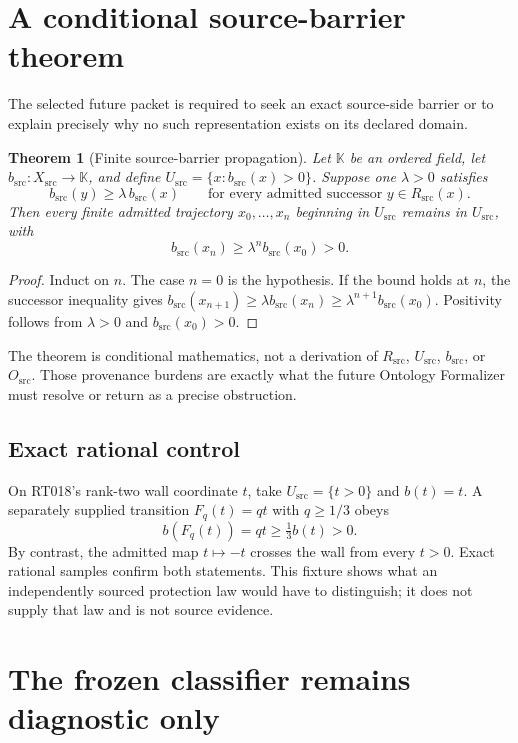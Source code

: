 \documentclass[11pt]{article}
\newtheorem{theorem}{Theorem}
\newcommand{\K}{\mathbb{K}}
\newcommand{\Xsrc}{X_{\mathrm{src}}}
\newcommand{\Rsrc}{R_{\mathrm{src}}}
\newcommand{\Usrc}{U_{\mathrm{src}}}
\newcommand{\bsrc}{b_{\mathrm{src}}}
\newcommand{\Osrc}{O_{\mathrm{src}}}
\begin{document}
\section{A conditional source-barrier theorem}

The selected future packet is required to seek an exact source-side barrier
or to explain precisely why no such representation exists on its declared
domain.

\begin{theorem}[Finite source-barrier propagation]
Let $\K$ be an ordered field, let $\bsrc:\Xsrc\to\K$, and define
$\Usrc=\{x:\bsrc(x)>0\}$.  Suppose one $\lambda>0$ satisfies
\[
  \bsrc(y)\geq \lambda\,\bsrc(x)
  \qquad\text{for every admitted successor }y\in\Rsrc(x).
\]
Then every finite admitted trajectory $x_0,\ldots,x_n$ beginning in $\Usrc$
remains in $\Usrc$, with
\[
  \bsrc(x_n)\geq \lambda^n\bsrc(x_0)>0.
\]
\end{theorem}

\begin{proof}
Induct on $n$.  The case $n=0$ is the hypothesis.  If the bound holds at
$n$, the successor inequality gives
$\bsrc(x_{n+1})\geq\lambda\bsrc(x_n)
\geq\lambda^{n+1}\bsrc(x_0)$.  Positivity follows from
$\lambda>0$ and $\bsrc(x_0)>0$.
\end{proof}

The theorem is conditional mathematics, not a derivation of $\Rsrc$,
$\Usrc$, $\bsrc$, or $\Osrc$.  Those provenance burdens are exactly what the
future Ontology Formalizer must resolve or return as a precise obstruction.

\subsection{Exact rational control}

On RT018's rank-two wall coordinate $t$, take $\Usrc=\{t>0\}$ and
$b(t)=t$.  A separately supplied transition $F_q(t)=qt$ with
$q\geq 1/3$ obeys
\[
  b(F_q(t))=qt\geq \tfrac13 b(t)>0.
\]
By contrast, the admitted map $t\mapsto -t$ crosses the wall from every
$t>0$.  Exact rational samples confirm both statements.  This fixture shows
what an independently sourced protection law would have to distinguish; it
does not supply that law and is not source evidence.

\section{The frozen classifier remains diagnostic only}
\end{document}
